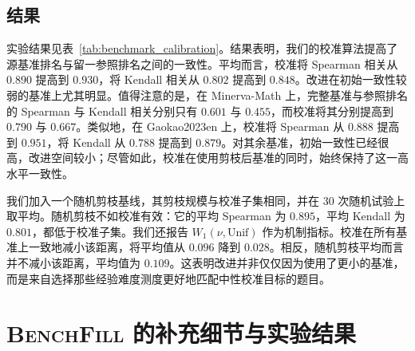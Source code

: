 \subsection{结果}

实验结果见表~\ref{tab:benchmark_calibration}。结果表明，我们的校准算法提高了源基准排名与留一参照排名之间的一致性。平均而言，校准将 Spearman 相关从 \(0.890\) 提高到 \(0.930\)，将 Kendall 相关从 \(0.802\) 提高到 \(0.848\)。改进在初始一致性较弱的基准上尤其明显。值得注意的是，在 Minerva-Math 上，完整基准与参照排名的 Spearman 与 Kendall 相关分别只有 \(0.601\) 与 \(0.455\)，而校准将其分别提高到 \(0.790\) 与 \(0.667\)。类似地，在 Gaokao2023en 上，校准将 Spearman 从 \(0.888\) 提高到 \(0.951\)，将 Kendall 从 \(0.788\) 提高到 \(0.879\)。对其余基准，初始一致性已经很高，改进空间较小；尽管如此，校准在使用剪枝后基准的同时，始终保持了这一高水平一致性。

我们加入一个随机剪枝基线，其剪枝规模与校准子集相同，并在 30 次随机试验上取平均。随机剪枝不如校准有效：它的平均 Spearman 为 \(0.895\)，平均 Kendall 为 \(0.801\)，都低于校准子集。我们还报告 \(W_1(\nu,\mathrm{Unif})\) 作为机制指标。校准在所有基准上一致地减小该距离，将平均值从 \(0.096\) 降到 \(0.028\)。相反，随机剪枝平均而言并不减小该距离，平均值为 \(0.109\)。这表明改进并非仅仅因为使用了更小的基准，而是来自选择那些经验难度测度更好地匹配中性校准目标的题目。


\section{\textsc{BenchFill} 的补充细节与实验结果}



